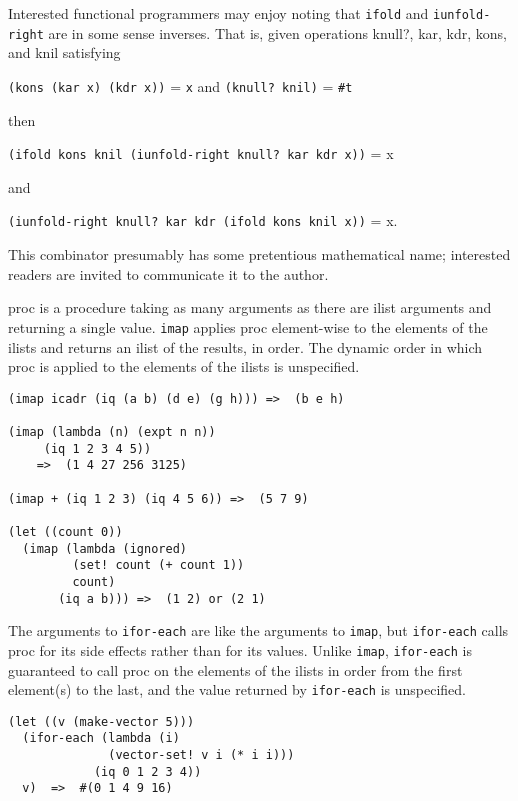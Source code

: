\begin{entry}{%
  }
Interested functional programmers may enjoy noting that \texttt{ifold}
and \texttt{iunfold-right} are in some sense inverses. That is, given
operations knull?, kar, kdr, kons, and knil satisfying

\texttt{(kons\ (kar\ x)\ (kdr\ x))} = \texttt{x} and \texttt{(knull?\
  knil)} = \texttt{\#t}

then

\texttt{(ifold\ kons\ knil\ (iunfold-right\ knull?\ kar\ kdr\ x))} = x

and

\texttt{(iunfold-right\ knull?\ kar\ kdr\ (ifold\ kons\ knil\ x))} =
x.

This combinator presumably has some pretentious mathematical name;
interested readers are invited to communicate it to the author.
\end{entry}

\begin{entry}{%
  }

  proc is a procedure taking as many arguments as there are
  ilist arguments and returning a single value. \texttt{imap} applies
  proc element-wise to the elements of the ilists and returns an ilist
  of the results, in order. The dynamic order in which proc is applied
  to the elements of the ilists is unspecified.

\begin{verbatim}
(imap icadr (iq (a b) (d e) (g h))) =>  (b e h)

(imap (lambda (n) (expt n n))
     (iq 1 2 3 4 5))
    =>  (1 4 27 256 3125)

(imap + (iq 1 2 3) (iq 4 5 6)) =>  (5 7 9)

(let ((count 0))
  (imap (lambda (ignored)
         (set! count (+ count 1))
         count)
       (iq a b))) =>  (1 2) or (2 1)
\end{verbatim}
\end{entry}

\begin{entry}{%
  }

The arguments to \texttt{ifor-each}
  are like the arguments to \texttt{imap}, but \texttt{ifor-each}
  calls proc for its side effects rather than for its values. Unlike
  \texttt{imap}, \texttt{ifor-each} is guaranteed to call proc on the
  elements of the ilists in order from the first element(s) to the
  last, and the value returned by \texttt{ifor-each} is unspecified.

\begin{verbatim}
(let ((v (make-vector 5)))
  (ifor-each (lambda (i)
              (vector-set! v i (* i i)))
            (iq 0 1 2 3 4))
  v)  =>  #(0 1 4 9 16)
\end{verbatim}
\end{entry}

